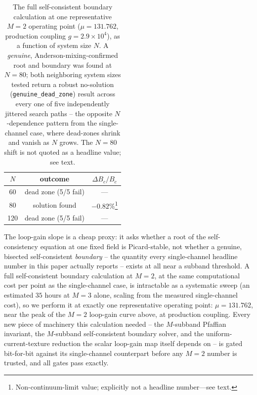 \documentclass[aps,physrev,reprint,superscriptaddress,amsmath,amssymb,floatfix]{revtex4-2}
\begin{document}
\begin{table}[t]
\caption{The full self-consistent boundary calculation at one
representative $M=2$ operating point ($\mu=131.762$, production coupling
$g=2.9\times10^4$), as a function of system size $N$. A \emph{genuine},
Anderson-mixing-confirmed root and boundary was found at $N=80$; both
neighboring system sizes tested return a robust no-solution
(\texttt{genuine\_dead\_zone}) result across every one of five
independently jittered search paths -- the opposite $N$-dependence
pattern from the single-channel case, where dead-zones shrink and vanish
as $N$ grows. The $N=80$ shift is not quoted as a headline value; see
text.}
\label{tab:m2existence}
\begin{ruledtabular}
\begin{tabular}{ccc}
$N$ & outcome & $\Delta B_c/B_c$ \\
\hline
60  & dead zone (5/5 fail) & --- \\
80  & solution found & $-0.82\%$\footnote{Non-continuum-limit value; explicitly not a headline number---see text.} \\
120 & dead zone (5/5 fail) & --- \\
\end{tabular}
\end{ruledtabular}
\end{table}

The loop-gain slope is a cheap proxy: it asks whether a root of the
self-consistency equation at one fixed field is Picard-stable, not
whether a genuine, bisected self-consistent \emph{boundary} -- the
quantity every single-channel headline number in this paper actually
reports -- exists at all near a subband threshold. A full self-consistent
boundary calculation at $M=2$, at the same computational cost per point
as the single-channel case, is intractable as a systematic sweep (an
estimated $35$ hours at $M=3$ alone, scaling from the measured
single-channel cost), so we perform it at exactly one representative
operating point: $\mu=131.762$, near the peak of the $M=2$ loop-gain
curve above, at production coupling. Every new piece of machinery this
calculation needed -- the $M$-subband Pfaffian invariant, the $M$-subband
self-consistent boundary solver, and the uniform-current-texture
reduction the scalar loop-gain map itself depends on -- is gated
bit-for-bit against its single-channel counterpart before any $M=2$
number is trusted, and all gates pass exactly.
\end{document}

